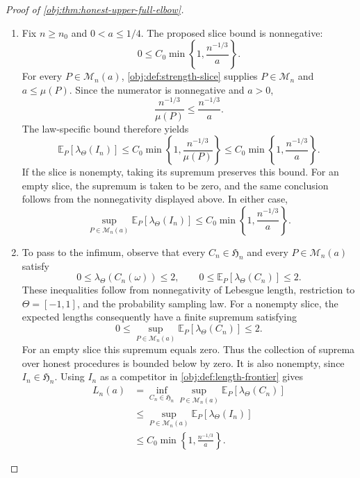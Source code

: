 \documentclass[11pt]{article}
\begin{document}
\begin{proof}[Proof of \cref{obj:thm:honest-upper-full-elbow}]
\begin{enumerate}
\item
Fix \(n\ge n_0\) and \(0<a\le1/4\).
The proposed slice bound is nonnegative:
\[
0\le C_0\min\left\{1,\frac{n^{-1/3}}a\right\}.
\]
For every \(P\in\mathcal M_n(a)\),
\cref{obj:def:strength-slice} supplies \(P\in\mathcal M_n\) and
\(a\le\mu(P)\). Since the numerator is nonnegative and \(a>0\),
\[
\frac{n^{-1/3}}{\mu(P)}\le\frac{n^{-1/3}}a.
\]
The law-specific bound therefore yields
\[
\mathbb E_P[\lambda_\Theta(I_n)]
\le
C_0\min\left\{1,\frac{n^{-1/3}}{\mu(P)}\right\}
\le
C_0\min\left\{1,\frac{n^{-1/3}}a\right\}.
\]
If the slice is nonempty, taking its supremum preserves this bound.
For an empty slice, the supremum is taken to be zero, and the same
conclusion follows from the nonnegativity displayed above. In either case,
\[
\sup_{P\in\mathcal M_n(a)}
\mathbb E_P[\lambda_\Theta(I_n)]
\le
C_0\min\left\{1,\frac{n^{-1/3}}a\right\}.
\]

\item
To pass to the infimum, observe that every
\(C_n\in\mathfrak H_n\) and every \(P\in\mathcal M_n(a)\) satisfy
\[
0\le\lambda_\Theta(C_n(\omega))\le2,
\qquad
0\le\mathbb E_P[\lambda_\Theta(C_n)]\le2.
\]
These inequalities follow from nonnegativity of Lebesgue length,
restriction to \(\Theta=[-1,1]\), and the probability sampling law.
For a nonempty slice, the expected lengths consequently have a finite
supremum satisfying
\[
0\le
\sup_{P\in\mathcal M_n(a)}
\mathbb E_P[\lambda_\Theta(C_n)]
\le2.
\]
For an empty slice this supremum equals zero. Thus the collection of
suprema over honest procedures is bounded below by zero. It is also
nonempty, since \(I_n\in\mathfrak H_n\). Using \(I_n\) as a competitor in
\cref{obj:def:length-frontier} gives
\[
\begin{aligned}
L_n(a)
&=
\inf_{C_n\in\mathfrak H_n}
\sup_{P\in\mathcal M_n(a)}
\mathbb E_P[\lambda_\Theta(C_n)]\\
&\le
\sup_{P\in\mathcal M_n(a)}
\mathbb E_P[\lambda_\Theta(I_n)]\\
&\le
C_0\min\left\{1,\frac{n^{-1/3}}a\right\}.
\end{aligned}
\]
\end{enumerate}
\end{proof}
\end{document}
